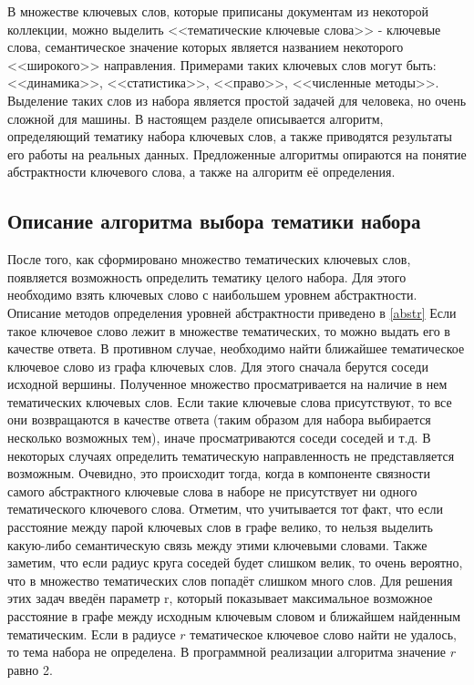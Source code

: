 В множестве ключевых слов, которые приписаны документам из некоторой коллекции, можно выделить <<тематические ключевые слова>> - ключевые слова, семантическое значение которых является названием некоторого <<широкого>> направления. Примерами таких ключевых слов могут быть: <<динамика>>, <<статистика>>, <<право>>, <<численные методы>>. Выделение таких слов из набора является простой задачей для человека, но очень сложной для машины. В настоящем разделе описывается алгоритм, определяющий тематику набора ключевых слов, а также приводятся результаты его работы на реальных данных. Предложенные алгоритмы опираются на понятие абстрактности ключевого слова, а также на алгоритм её определения.


\subsection{Описание алгоритма выбора тематики набора}
После того, как сформировано множество тематических ключевых слов, появляется возможность определить тематику целого набора. Для этого необходимо взять ключевых слово с наибольшем уровнем абстрактности. Описание методов определения уровней абстрактности приведено в \ref{abstr} Если такое ключевое слово лежит в множестве тематических, то можно выдать его в качестве ответа. В противном случае, необходимо найти ближайшее тематическое ключевое слово из графа ключевых слов. Для этого сначала берутся соседи исходной вершины. Полученное множество просматривается на наличие в нем тематических ключевых слов. Если такие ключевые слова присутствуют, то все они возвращаются в качестве ответа (таким образом для набора выбирается несколько возможных тем), иначе просматриваются соседи соседей и т.д. В некоторых случаях определить тематическую направленность не представляется возможным. Очевидно, это происходит тогда, когда в компоненте связности самого абстрактного ключевые слова в наборе не присутствует ни одного тематического ключевого слова.  Отметим, что учитывается тот факт, что если расстояние между парой ключевых слов в графе велико, то нельзя выделить какую-либо семантическую связь между этими ключевыми словами. Также заметим, что если радиус круга соседей будет слишком велик, то очень вероятно, что в множество тематических слов попадёт слишком много слов. Для решения этих задач введён параметр r, который показывает максимальное возможное расстояние в графе между исходным ключевым словом и ближайшем найденным тематическим. Если в радиусе $r$ тематическое ключевое слово найти не удалось, то тема набора не определена. В программной реализации алгоритма значение $r$ равно 2.

